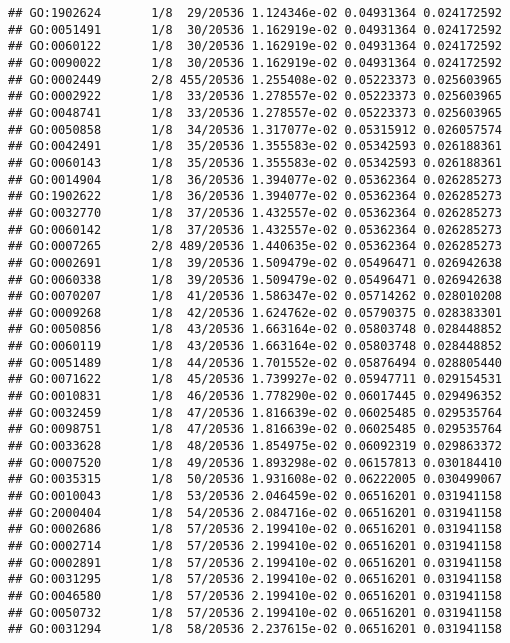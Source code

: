 \documentclass[
]{article}
\begin{document}
\begin{verbatim}
## GO:1902624       1/8  29/20536 1.124346e-02 0.04931364 0.024172592
## GO:0051491       1/8  30/20536 1.162919e-02 0.04931364 0.024172592
## GO:0060122       1/8  30/20536 1.162919e-02 0.04931364 0.024172592
## GO:0090022       1/8  30/20536 1.162919e-02 0.04931364 0.024172592
## GO:0002449       2/8 455/20536 1.255408e-02 0.05223373 0.025603965
## GO:0002922       1/8  33/20536 1.278557e-02 0.05223373 0.025603965
## GO:0048741       1/8  33/20536 1.278557e-02 0.05223373 0.025603965
## GO:0050858       1/8  34/20536 1.317077e-02 0.05315912 0.026057574
## GO:0042491       1/8  35/20536 1.355583e-02 0.05342593 0.026188361
## GO:0060143       1/8  35/20536 1.355583e-02 0.05342593 0.026188361
## GO:0014904       1/8  36/20536 1.394077e-02 0.05362364 0.026285273
## GO:1902622       1/8  36/20536 1.394077e-02 0.05362364 0.026285273
## GO:0032770       1/8  37/20536 1.432557e-02 0.05362364 0.026285273
## GO:0060142       1/8  37/20536 1.432557e-02 0.05362364 0.026285273
## GO:0007265       2/8 489/20536 1.440635e-02 0.05362364 0.026285273
## GO:0002691       1/8  39/20536 1.509479e-02 0.05496471 0.026942638
## GO:0060338       1/8  39/20536 1.509479e-02 0.05496471 0.026942638
## GO:0070207       1/8  41/20536 1.586347e-02 0.05714262 0.028010208
## GO:0009268       1/8  42/20536 1.624762e-02 0.05790375 0.028383301
## GO:0050856       1/8  43/20536 1.663164e-02 0.05803748 0.028448852
## GO:0060119       1/8  43/20536 1.663164e-02 0.05803748 0.028448852
## GO:0051489       1/8  44/20536 1.701552e-02 0.05876494 0.028805440
## GO:0071622       1/8  45/20536 1.739927e-02 0.05947711 0.029154531
## GO:0010831       1/8  46/20536 1.778290e-02 0.06017445 0.029496352
## GO:0032459       1/8  47/20536 1.816639e-02 0.06025485 0.029535764
## GO:0098751       1/8  47/20536 1.816639e-02 0.06025485 0.029535764
## GO:0033628       1/8  48/20536 1.854975e-02 0.06092319 0.029863372
## GO:0007520       1/8  49/20536 1.893298e-02 0.06157813 0.030184410
## GO:0035315       1/8  50/20536 1.931608e-02 0.06222005 0.030499067
## GO:0010043       1/8  53/20536 2.046459e-02 0.06516201 0.031941158
## GO:2000404       1/8  54/20536 2.084716e-02 0.06516201 0.031941158
## GO:0002686       1/8  57/20536 2.199410e-02 0.06516201 0.031941158
## GO:0002714       1/8  57/20536 2.199410e-02 0.06516201 0.031941158
## GO:0002891       1/8  57/20536 2.199410e-02 0.06516201 0.031941158
## GO:0031295       1/8  57/20536 2.199410e-02 0.06516201 0.031941158
## GO:0046580       1/8  57/20536 2.199410e-02 0.06516201 0.031941158
## GO:0050732       1/8  57/20536 2.199410e-02 0.06516201 0.031941158
## GO:0031294       1/8  58/20536 2.237615e-02 0.06516201 0.031941158

\end{verbatim}
\end{document}
